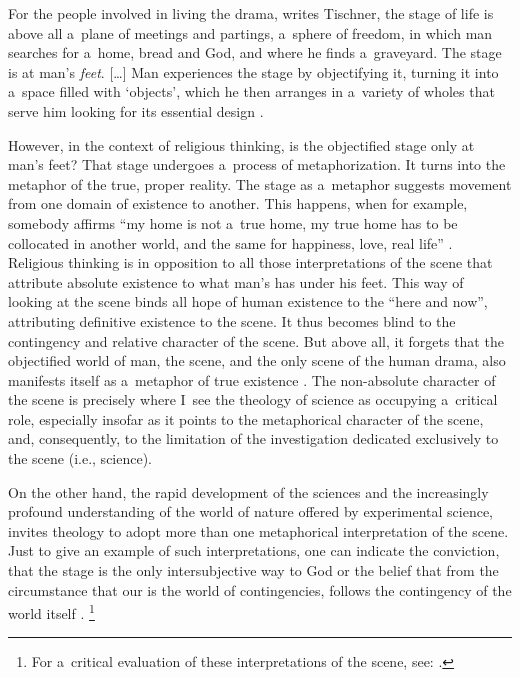 For the people involved in living the drama, writes Tischner, the stage of life is above all a~plane of meetings and partings, a~sphere of freedom, in which man searches for a~home, bread and God, and where he finds a~graveyard. The stage is at man's \textit{feet}. […] Man experiences the stage by objectifying it, turning it into a~space filled with ‘objects', which he then arranges in a~variety of wholes that serve him looking for its essential design 
\parencite[][p.166]{jagiello_jozef_2020}.%




However, in the context of religious thinking, is the objectified stage only at man's feet? That stage undergoes a~process of metaphorization. It turns into the metaphor of the true, proper reality. The stage as a~metaphor suggests movement from one domain of existence to another. This happens, when for example, somebody affirms ``my home is not a~true home, my true home has to be collocated in another world, and the same for happiness, love, real life'' 
\parencite[][p.388]{tischner_myslenie_2011-1}. %
 Religious thinking is in opposition to all those interpretations of the scene that attribute absolute existence to what man's has under his feet. This way of looking at the scene binds all hope of human existence to the ``here and now'', attributing definitive existence to the scene. It thus becomes blind to the contingency and relative character of the scene. But above all, it forgets that the objectified world of man, the scene, and the only scene of the human drama, also manifests itself as a~metaphor of true existence 
\parencite[][p.391]{tischner_myslenie_2011-1}. %
 The non-absolute character of the scene is precisely where I~see the theology of science as occupying a~critical role, especially insofar as it points to the metaphorical character of the scene, and, consequently, to the limitation of the investigation dedicated exclusively to the scene (i.e., science).



On the other hand, the rapid development of the sciences and the increasingly profound understanding of the world of nature offered by experimental science, invites theology to adopt more than one metaphorical interpretation of the scene. Just to give an example of such interpretations, one can indicate the conviction, that the stage is the only intersubjective way to God or the belief that from the circumstance that our is the world of contingencies, follows the contingency of the world itself 
\parencite[][pp.386–387]{tischner_myslenie_2011-1}.%
\footnote{For a~critical evaluation of these interpretations of the scene, see: 
\parencite[][]{hunsinger_barth_2019}.%
}



